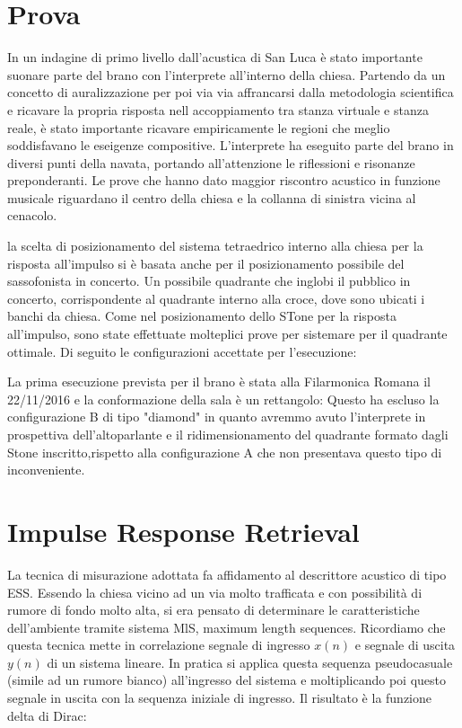\section{Prova}

In un indagine di primo livello dall'acustica di San Luca è stato importante suonare
parte del brano con l'interprete all'interno della chiesa. Partendo da un concetto
di auralizzazione per poi via via affrancarsi dalla metodologia scientifica e ricavare
la propria risposta nell accoppiamento tra stanza virtuale e stanza reale, è stato
importante ricavare empiricamente le regioni che meglio soddisfavano le eseigenze
compositive. L'interprete ha eseguito parte del brano in diversi punti della navata,
portando all'attenzione le riflessioni e risonanze preponderanti. 
Le prove che hanno dato maggior riscontro acustico in funzione musicale riguardano
il centro della chiesa e la collanna di sinistra vicina al cenacolo.

la scelta di posizionamento del sistema tetraedrico interno alla chiesa per la
risposta all'impulso si è basata anche per il posizionamento possibile del sassofonista
in concerto.
Un possibile quadrante che inglobi il pubblico in concerto, corrispondente al
quadrante interno alla croce, dove sono ubicati i banchi da chiesa.
Come nel posizionamento dello STone per la risposta all'impulso, sono state
effettuate molteplici prove per sistemare per il quadrante ottimale. Di seguito
le configurazioni accettate per l'esecuzione:

\begin{figure}[h]
\centering
{} \quad
{}
\end{figure}

La prima esecuzione prevista per il brano è stata alla Filarmonica Romana il
22/11/2016 e la conformazione della sala è un rettangolo: Questo ha escluso
la configurazione B di tipo "diamond" in quanto avremmo avuto l'interprete in
prospettiva dell'altoparlante e il ridimensionamento del quadrante formato dagli
Stone inscritto,rispetto alla configurazione A che non presentava questo tipo di inconveniente.

\section{Impulse Response Retrieval} 

La tecnica di misurazione adottata fa affidamento al descrittore acustico di tipo ESS.
Essendo la chiesa vicino ad un via molto trafficata e con possibilità di rumore di
fondo molto alta, si era pensato di determinare le caratteristiche dell'ambiente
tramite sistema MlS, maximum length sequences. 
Ricordiamo che questa tecnica mette in correlazione segnale di ingresso $ x(n) $
e segnale di uscita $ y(n) $ di un sistema lineare. 
In pratica si applica questa sequenza pseudocasuale (simile ad un rumore bianco)
all'ingresso del sistema e moltiplicando poi questo segnale in uscita con la
sequenza iniziale di ingresso. Il risultato è la funzione delta di Dirac:

